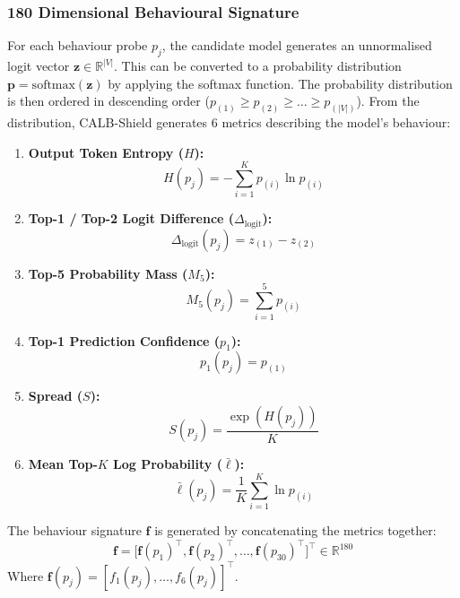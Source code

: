 \documentclass[conference]{IEEEtran}
\begin{document}
\subsubsection{180 Dimensional Behavioural Signature}
For each behaviour probe $p_j$, the candidate model generates an unnormalised logit vector $\mathbf{z} \in \mathbb{R}^{|V|}$. This can be converted to a probability distribution $\mathbf{p} = \text{softmax}(\mathbf{z})$ by applying the softmax function. The probability distribution is then ordered in descending order ($p_{(1)} \ge p_{(2)} \ge \dots \ge p_{(|V|)}$). From the distribution, CALB-Shield generates 6 metrics describing the model's behaviour:
\begin{enumerate}
    \item \textbf{Output Token Entropy ($H$):}
    \begin{equation}
    H(p_j) = -\sum_{i=1}^{K} p_{(i)} \ln p_{(i)}
    \end{equation}
    \item \textbf{Top-1 / Top-2 Logit Difference ($\Delta_{\text{logit}}$):}
    \begin{equation}
    \Delta_{\text{logit}}(p_j) = z_{(1)} - z_{(2)}
    \end{equation}
    \item \textbf{Top-5 Probability Mass ($M_5$):}
    \begin{equation}
    M_5(p_j) = \sum_{i=1}^{5} p_{(i)}
    \end{equation}
    \item \textbf{Top-1 Prediction Confidence ($p_1$):}
    \begin{equation}
    p_1(p_j) = p_{(1)}
    \end{equation}
    \item \textbf{Spread ($S$):}
    \begin{equation}
    S(p_j) = \frac{\exp(H(p_j))}{K}
    \end{equation}
    \item \textbf{Mean Top-$K$ Log Probability ($\bar{\ell}$):}
    \begin{equation}
    \bar{\ell}(p_j) = \frac{1}{K} \sum_{i=1}^{K} \ln p_{(i)}
    \end{equation}
\end{enumerate}

The behaviour signature $\mathbf{f}$ is generated by concatenating the metrics together:
\begin{equation}
\mathbf{f} = \big[ \mathbf{f}(p_1)^\top, \mathbf{f}(p_2)^\top, \dots, \mathbf{f}(p_{30})^\top \big]^\top \in \mathbb{R}^{180}
\end{equation}
Where $\mathbf{f}(p_j) = [f_1(p_j), \dots, f_6(p_j)]^\top$.
\end{document}
